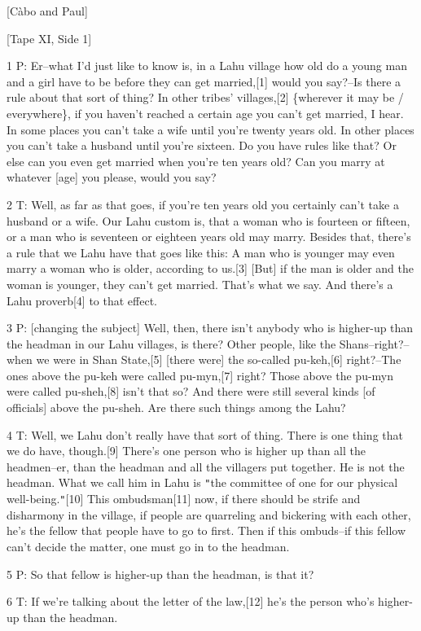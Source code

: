 
[Càbo and Paul]

[Tape XI, Side 1]

1 P: Er--what I'd just like to know is, in a Lahu village how old do a young man
and a girl have to be before they can get married,[1] would you say?--Is there
a rule about that sort of thing? In other tribes' villages,[2] \{wherever it may
be / everywhere\}, if you haven't reached a certain age you can't get married,
I hear. In some places you can't take a wife until you're twenty years old. In
other places you can't take a husband until you're sixteen. Do you have rules like
that? Or else can you even get married when you're ten years old? Can you marry
at whatever [age] you please, would you say?

2 T: Well, as far as that goes, if you're ten years old you certainly can't take
a husband or a wife. Our Lahu custom is, that a woman who is fourteen or fifteen,
or a man who is seventeen or eighteen years old may marry. Besides that, there's
a rule that we Lahu have that goes like this: A man who is younger may even marry
a woman who is older, according to us.[3] [But] if the man is older and the woman
is younger, they can't get married. That's what we say. And there's a Lahu proverb[4]
to that effect.

3 P: [changing the subject] Well, then, there isn't anybody who is higher-up than
the headman in our Lahu villages, is there? Other people, like the Shans--right?--when
we were in Shan State,[5] [there were] the so-called pu-keh,[6] right?--The ones
above the pu-keh were called pu-myn,[7] right? Those above the pu-myn were called
pu-sheh,[8] isn't that so? And there were still several kinds [of officials] above
the pu-sheh. Are there such things among the Lahu?

4 T: Well, we Lahu don't really have that sort of thing. There is one thing that
we do have, though.[9] There's one person who is higher up than all the headmen--er,
than the headman and all the villagers put together. He is not the headman. What
we call him in Lahu is \texttt{"}the committee of one for our physical well-being.\texttt{"}[10]
This ombudsman[11] now, if there should be strife and disharmony in the village,
if people are quarreling and bickering with each other, he's the fellow that people
have to go to first. Then if this ombuds--if this fellow can't decide the matter,
one must go in to the headman.

5 P: So that fellow is higher-up than the headman, is that it?

6 T: If we're talking about the letter of the law,[12] he's the person who's higher-up
than the headman.

